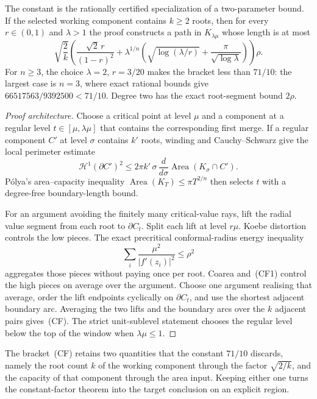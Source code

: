 The constant is the rationally certified specialization of a two-parameter
bound.  If the selected working component contains $k\ge2$ roots, then for
every $r\in(0,1)$ and $\lambda>1$ the proof constructs a path in
$K_{\lambda\mu}$ whose length is at most
\[
 \sqrt{\frac2k}\left(
   \frac{\sqrt2\,r}{(1-r)^2}
   +\lambda^{1/n}\left(
      \sqrt{\log(\lambda/r)}+
      \frac{\pi}{\sqrt{\log\lambda}}
    \right)
 \right)\rho.                                      \tag{CF}
\]
For $n\ge3$, the choice $\lambda=2$, $r=3/20$ makes the bracket less
than $71/10$: the largest case is $n=3$, where exact rational bounds give
$66517563/9392500<71/10$.  Degree two has the exact root-segment bound
$2\rho$.

\begin{proof}[Proof architecture]
Choose a critical point at level $\mu$ and a component at a regular level
$t\in[\mu,\lambda\mu]$ that contains the corresponding first merge.  If a
regular component $C'$ at level $\sigma$ contains $k'$ roots, winding and
Cauchy--Schwarz give the local perimeter estimate
\[
 \mathcal H^1(\partial C')^2
 \le2\pi k'\,\sigma\,\frac{d}{d\sigma}
      \operatorname{Area}(K_\sigma\cap C').         \tag{CF1}
\]
P\'olya's area--capacity inequality
$\operatorname{Area}(K_T)\le\pi T^{2/n}$ then selects $t$ with a
degree-free boundary-length bound.

For an argument avoiding the finitely many critical-value rays, lift the
radial value segment from each root to $\partial C_t$.  Split each lift at
level $r\mu$.  Koebe distortion controls the low pieces.  The exact
precritical conformal-radius energy inequality
\[
 \sum_i\frac{\mu^2}{|f'(z_i)|^2}\le\rho^2          \tag{CF2}
\]
aggregates those pieces without paying once per root.  Coarea and~(CF1)
control the high pieces on average over the argument.  Choose one argument
realising that average, order the lift endpoints cyclically on
$\partial C_t$, and use the shortest adjacent boundary arc.  Averaging the
two lifts and the boundary arcs over the $k$ adjacent pairs gives~(CF).
The strict unit-sublevel statement chooses the regular level below the top of
the window when $\lambda\mu\le1$.
\end{proof}

The bracket~(CF) retains two quantities that the constant $71/10$ discards,
namely the root count $k$ of the working component through the factor
$\sqrt{2/k}$, and the capacity of that component through the area input.
Keeping either one turns the constant-factor theorem into the target
conclusion on an explicit region.

